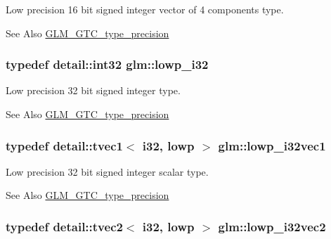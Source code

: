 Low precision 16 bit signed integer vector of 4 components type. \begin{DoxySeeAlso}{See Also}
\hyperlink{group__gtc__type__precision}{G\-L\-M\-\_\-\-G\-T\-C\-\_\-type\-\_\-precision} 
\end{DoxySeeAlso}
\hypertarget{group__gtc__type__precision_ga70fd34e8b8cffc92739161284ed77328}{
\subsubsection[{lowp\-\_\-i32}]{\setlength{\rightskip}{0pt plus 5cm}typedef detail\-::int32 {\bf glm\-::lowp\-\_\-i32}}}\label{group__gtc__type__precision_ga70fd34e8b8cffc92739161284ed77328}
Low precision 32 bit signed integer type. \begin{DoxySeeAlso}{See Also}
\hyperlink{group__gtc__type__precision}{G\-L\-M\-\_\-\-G\-T\-C\-\_\-type\-\_\-precision} 
\end{DoxySeeAlso}
\hypertarget{group__gtc__type__precision_gadb82f1c8a0f4d3304862d32079961974}{
\subsubsection[{lowp\-\_\-i32vec1}]{\setlength{\rightskip}{0pt plus 5cm}typedef detail\-::tvec1$<$ i32, lowp $>$ {\bf glm\-::lowp\-\_\-i32vec1}}}\label{group__gtc__type__precision_gadb82f1c8a0f4d3304862d32079961974}
Low precision 32 bit signed integer scalar type. \begin{DoxySeeAlso}{See Also}
\hyperlink{group__gtc__type__precision}{G\-L\-M\-\_\-\-G\-T\-C\-\_\-type\-\_\-precision} 
\end{DoxySeeAlso}
\hypertarget{group__gtc__type__precision_ga1ac855a9b4ef24908d00ab715e7ddbff}{
\subsubsection[{lowp\-\_\-i32vec2}]{\setlength{\rightskip}{0pt plus 5cm}typedef detail\-::tvec2$<$ i32, lowp $>$ {\bf glm\-::lowp\-\_\-i32vec2}}}\label{group__gtc__type__precision_ga1ac855a9b4ef24908d00ab715e7ddbff}
